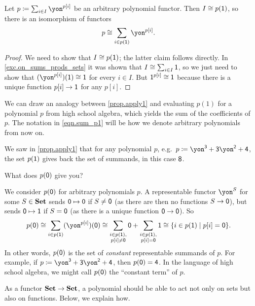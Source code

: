 \documentclass[Book-Poly]{subfiles}
\begin{document}
\begin{proposition}\label{prop.apply1}
Let $p\coloneqq\sum_{i\in I}\yon^{p[i]}$ be an arbitrary polynomial functor. Then $I\cong p(\textsf{1})$, so there is an isomorphism of functors
\begin{equation}\label{eqn.sum_p1}
p\iso\sum_{i\in p(\1)}\yon^{p[i]}.
\end{equation}
\end{proposition}
\begin{proof}
We need to show that $I\cong p(\textsf{1})$; the latter claim follows directly. In \cref{exc.on_sums_prods_sets} it was shown that $I\cong\sum_{i\in I}\textsf{1}$, so we just need to show that $(\yon^{p[i]})(\1)\iso\1$ for every $i \in I$. But $\textsf{1}^{p[i]}\cong \textsf{1}$ because there is a unique function $p[i]\to \textsf{1}$ for any $p[i]$.
\end{proof}
We can draw an analogy between \cref{prop.apply1} and evaluating $p(1)$ for a polynomial $p$ from high school algebra, which yields the sum of the coefficients of $p$.
The notation in \eqref{eqn.sum_p1} will be how we denote arbitrary polynomials from now on.

\begin{exercise}\label{exc.apply0}
We saw in \cref{prop.apply1} that for any polynomial $p$, e.g.\ $p\coloneqq\yon^\3+\3\yon^\2+\4$, the set $p(\textsf{1})$ gives back the set of summands, in this case $\textsf{8}$. 

What does $p(\textsf{0})$ give you?
\begin{solution}
We consider $p(\textsf{0})$ for arbitrary polynomials $p$.
A representable functor $\yon^S$ for some $S \in \mathbf{Set}$ sends $\textsf{0} \mapsto \textsf{0}$ if $S \neq \textsf{0}$ (as there are then no functions $S \to \textsf{0}$), but sends $\textsf{0} \mapsto \textsf{1}$ if $S = \textsf{0}$ (as there is a unique function $\textsf{0} \to \textsf{0}$).
So
\[
    p(\0) \iso \sum_{i \in p(\1)} (\yon^{p[i]})(\0) \iso \sum_{\substack{i \in p(\1), \\ p[i] \neq \0}} \0 + \sum_{\substack{i \in p(\1), \\ p[i] = \0}} \1 \iso \{i \in p(\1) \mid p[i] = \0\}.
\]
In other words, $p(\textsf{0})$ is the set of \emph{constant} representable summands of $p$.
For example, if $p\coloneqq\yon^\3+\3\yon^\2+\4$, then $p(\textsf{0}) = \textsf{4}$.
In the language of high school algebra, we might call $p(\textsf{0})$ the ``constant term'' of $p$.
\end{solution}
\end{exercise}

As a functor $\mathbf{Set}\to\mathbf{Set}$, a polynomial should be able to act not only on sets but also on functions.
Below, we explain how.
\end{document}

